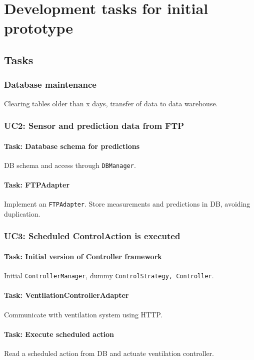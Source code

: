 \chapter{Development tasks for initial prototype}

\section{Tasks}

\subsection*{Database maintenance}
Clearing tables older than x days, transfer of data to data warehouse.

\subsection*{UC2: Sensor and prediction data from FTP}
\subsubsection{Task: Database schema for predictions}
DB schema and access through \texttt{DBManager}.

\subsubsection{Task: FTPAdapter}
Implement an \texttt{FTPAdapter}. Store measurements and predictions in DB, avoiding duplication.

\subsection*{UC3: Scheduled ControlAction is executed}
\subsubsection{Task: Initial version of Controller framework}
Initial \texttt{ControllerManager}, dummy \texttt{ControlStrategy, Controller}.

\subsubsection{Task: VentilationControllerAdapter}
Communicate with ventilation system using HTTP.

\subsubsection{Task: Execute scheduled action}
Read a scheduled action from DB and actuate ventilation controller.

